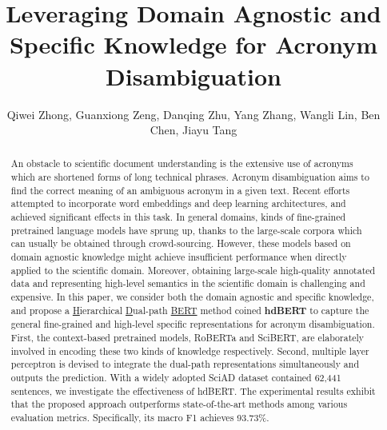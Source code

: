 \documentclass[letterpaper]{article} %
\title{
Leveraging Domain Agnostic and Specific Knowledge for Acronym Disambiguation
}
\author{
    Qiwei Zhong, Guanxiong Zeng, Danqing Zhu, Yang Zhang, Wangli Lin, Ben Chen, Jiayu Tang\\
}
\begin{document}
\maketitle
\begin{abstract}
An obstacle to scientific document understanding is the extensive use of acronyms which are shortened forms of long technical phrases. Acronym disambiguation aims to find the correct meaning of an ambiguous acronym in a given text. Recent efforts attempted to incorporate word embeddings and deep learning architectures, and achieved significant effects in this task.
In general domains, kinds of fine-grained pretrained language models
have sprung up, thanks to the large-scale corpora which can usually be obtained through crowd-sourcing.
However, these models based on domain agnostic knowledge might achieve insufficient performance when directly applied to the scientific domain. Moreover, obtaining large-scale high-quality annotated data and representing high-level semantics in the scientific domain is challenging and expensive.
In this paper, we consider both the domain agnostic and specific knowledge, and propose a \underline{H}ierarchical \underline{D}ual-path \underline{BERT} method coined \textbf{hdBERT} to capture the general fine-grained and high-level specific representations for acronym disambiguation. First, the context-based pretrained models, RoBERTa and SciBERT, are elaborately involved in encoding these two kinds of knowledge respectively. Second, multiple layer perceptron is devised to integrate the dual-path representations simultaneously and outputs the prediction. With a widely adopted SciAD dataset contained 62,441 sentences, we investigate the effectiveness of hdBERT. The experimental results exhibit that the proposed approach outperforms state-of-the-art methods among various evaluation metrics. Specifically, its macro F1 achieves 93.73\%.





\end{abstract}
\end{document}
